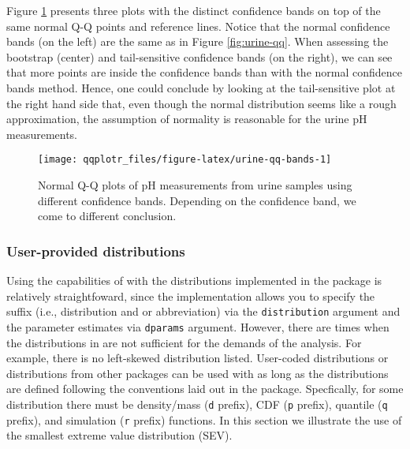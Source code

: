 Figure \ref{fig:urine-qq-bands} presents three plots with the distinct
confidence bands on top of the same normal Q-Q points and reference
lines. Notice that the normal confidence bands (on the left) are the
same as in Figure \ref{fig:urine-qq}. When assessing the bootstrap
(center) and tail-sensitive confidence bands (on the right), we can see
that more points are inside the confidence bands than with the normal
confidence bands method. Hence, one could conclude by looking at the
tail-sensitive plot at the right hand side that, even though the normal
distribution seems like a rough approximation, the assumption of
normality is reasonable for the urine pH measurements.

\begin{Schunk}
\begin{figure}

{\centering \texttt{[image: qqplotr\_files/figure-latex/urine-qq-bands-1]} 

}

\caption[Normal Q-Q plots of pH measurements from urine samples using different confidence bands]{Normal Q-Q plots of pH measurements from urine samples using different confidence bands. Depending on the confidence band, we come to different conclusion.}\label{fig:urine-qq-bands}
\end{figure}
\end{Schunk}

\FloatBarrier

\subsubsection{User-provided
distributions}\label{user-provided-distributions}

\label{sec:user-dists}

Using the capabilities of  with the distributions
implemented in the  package is relatively straightfoward,
since the implementation allows you to specify the suffix (i.e.,
distribution and or abbreviation) via the \texttt{distribution} argument
and the parameter estimates via \texttt{dparams} argument. However,
there are times when the distributions in  are not sufficient
for the demands of the analysis. For example, there is no left-skewed
distribution listed. User-coded distributions or distributions from
other packages can be used with  as long as the
distributions are defined following the conventions laid out in the
 package. Specfically, for some distribution there must be
density/mass (\texttt{d} prefix), CDF (\texttt{p} prefix), quantile
(\texttt{q} prefix), and simulation (\texttt{r} prefix) functions. In
this section we illustrate the use of the smallest extreme value
distribution (SEV).

